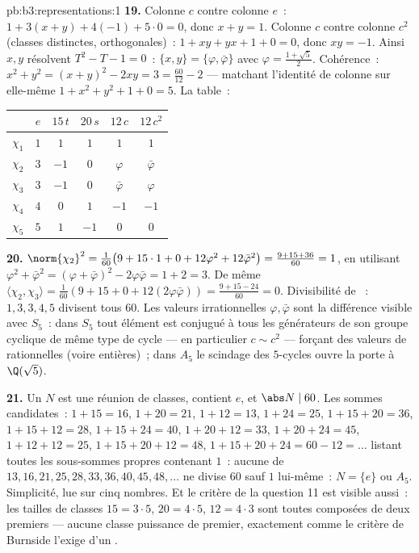 \begin{solution}{pb:b3:representations:1}
\textbf{19.} Colonne $c$ contre colonne $e$~: $1 + 3(x + y) +
4(-1) + 5\cdot0 = 0$, donc $x + y = 1$. Colonne $c$ contre
colonne $c^2$ (classes distinctes, orthogonales)~: $1 + xy +
yx + 1 + 0 = 0$, donc $xy = -1$. Ainsi $x, y$ résolvent $T^2 -
T - 1 = 0$~: $\{x, y\} = \{\varphi, \bar\varphi\}$ avec
$\varphi = \frac{1 + \sqrt5}2$. Cohérence~: $x^2 + y^2 =
(x+y)^2 - 2xy = 3 = \frac{60}{12} - 2$ --- matchant l'identité
de colonne sur elle-même $1 + x^2 + y^2 + 1 + 0 = 5$. La
table~:
\begin{center}
\begin{tabular}{c|ccccc}
 & $e$ & $15\,t$ & $20\,s$ & $12\,c$ & $12\,c^2$\\
\hline
$\chi_1$ & $1$ & $1$ & $1$ & $1$ & $1$\\
$\chi_2$ & $3$ & $-1$ & $0$ & $\varphi$ & $\bar\varphi$\\
$\chi_3$ & $3$ & $-1$ & $0$ & $\bar\varphi$ & $\varphi$\\
$\chi_4$ & $4$ & $0$ & $1$ & $-1$ & $-1$\\
$\chi_5$ & $5$ & $1$ & $-1$ & $0$ & $0$\\
\end{tabular}
\end{center}

\textbf{20.} $\norm{\chi_2}^2 = \frac1{60}\bigl(9 + 15\cdot1 +
0 + 12\varphi^2 + 12\bar\varphi^2\bigr) = \frac{9 + 15 +
36}{60} = 1$, en utilisant $\varphi^2 + \bar\varphi^2 =
(\varphi + \bar\varphi)^2 - 2\varphi\bar\varphi = 1 + 2 = 3$.
De même $\langle\chi_2, \chi_3\rangle = \frac1{60}(9 + 15 + 0 +
12(2\varphi\bar\varphi)) = \frac{9 + 15 - 24}{60} = 0$.
Divisibilité de ~: $1, 3, 3, 4, 5$ divisent tous
$60$. Les valeurs irrationnelles $\varphi, \bar\varphi$ sont
la différence visible avec $S_5$~: dans $S_5$ tout élément est
conjugué à tous les générateurs de son groupe cyclique de même
type de cycle --- en particulier $c \sim c^2$ --- forçant des
valeurs de  rationnelles (voire entières)~; dans
$A_5$ le scindage des $5$-cycles ouvre la porte à $\Q(\sqrt5)$.

\textbf{21.} Un  $N$ est une réunion de
classes, contient $e$, et $\abs N \mid 60$. Les sommes
candidates~: $1{+}15 = 16$, $1{+}20 = 21$, $1{+}12 = 13$,
$1{+}24 = 25$, $1{+}15{+}20 = 36$, $1{+}15{+}12 = 28$,
$1{+}15{+}24 = 40$, $1{+}20{+}12 = 33$, $1{+}20{+}24 = 45$,
$1{+}12{+}12 = 25$, $1{+}15{+}20{+}12 = 48$, $1{+}15{+}20{+}24
= 60 - 12 = \dots$ listant toutes les sous-sommes propres
contenant $1$~: aucune de $13, 16, 21, 25, 28, 33, 36, 40, 45,
48, \dots$ ne divise $60$ sauf $1$ lui-même~: $N = \{e\}$ ou
$A_5$. Simplicité, lue sur cinq nombres. Et le critère de la
question 11 est visible aussi~: les tailles de classes $15 =
3\cdot5$, $20 = 4\cdot5$, $12 = 4\cdot3$ sont toutes composées
de deux premiers --- aucune classe puissance de premier,
exactement comme le critère de Burnside l'exige d'un .


\end{solution}
